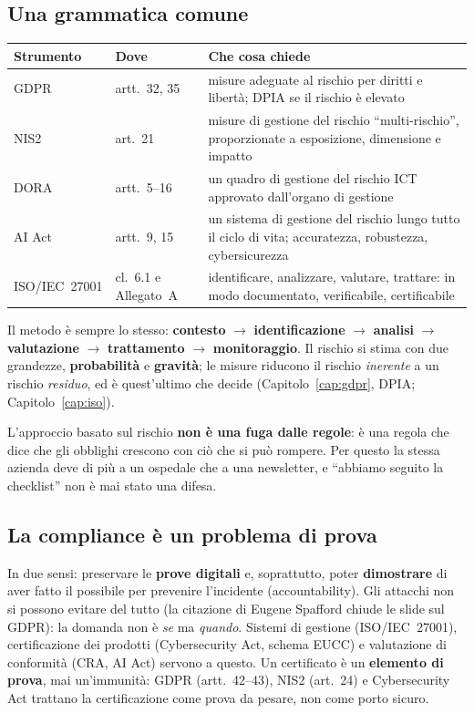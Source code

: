 \subsection{Una grammatica comune}
\begin{center}
\small
\begin{tabularx}{\linewidth}{>{\raggedright\arraybackslash}p{2.4cm} >{\raggedright\arraybackslash}p{2.6cm} X}
\toprule
\textbf{Strumento} & \textbf{Dove} & \textbf{Che cosa chiede}\\
\midrule
GDPR & artt.~32, 35 & misure adeguate al rischio per diritti e libertà; DPIA se il rischio è elevato\\
NIS2 & art.~21 & misure di gestione del rischio ``multi-rischio'', proporzionate a esposizione,
  dimensione e impatto\\
DORA & artt.~5--16 & un quadro di gestione del rischio ICT approvato dall'organo di gestione\\
AI Act & artt.~9, 15 & un sistema di gestione del rischio lungo tutto il ciclo di vita; accuratezza,
  robustezza, cybersicurezza\\
ISO/IEC~27001 & cl.~6.1 e Allegato~A & identificare, analizzare, valutare, trattare: in modo
  documentato, verificabile, certificabile\\
\bottomrule
\end{tabularx}
\end{center}
Il metodo è sempre lo stesso: \textbf{contesto} $\rightarrow$ \textbf{identificazione} $\rightarrow$
\textbf{analisi} $\rightarrow$ \textbf{valutazione} $\rightarrow$ \textbf{trattamento} $\rightarrow$
\textbf{monitoraggio}. Il rischio si stima con due grandezze, \textbf{probabilità} e \textbf{gravità};
le misure riducono il rischio \emph{inerente} a un rischio \emph{residuo}, ed è quest'ultimo che decide
(Capitolo~\ref{cap:gdpr}, DPIA; Capitolo~\ref{cap:iso}).

L'approccio basato sul rischio \textbf{non è una fuga dalle regole}: è una regola che dice che gli
obblighi crescono con ciò che si può rompere. Per questo la stessa azienda deve di più a un ospedale che a
una newsletter, e ``abbiamo seguito la checklist'' non è mai stato una difesa.

\subsection{La compliance è un problema di prova}
In due sensi: preservare le \textbf{prove digitali} e, soprattutto, poter \textbf{dimostrare} di aver
fatto il possibile per prevenire l'incidente (accountability). Gli attacchi non si possono evitare del
tutto (la citazione di Eugene Spafford chiude le slide sul GDPR): la domanda non è \emph{se} ma
\emph{quando}. Sistemi di gestione (ISO/IEC~27001), certificazione dei prodotti (Cybersecurity Act,
schema EUCC) e valutazione di conformità (CRA, AI Act) servono a questo. Un certificato è un
\textbf{elemento di prova}, mai un'immunità: GDPR (artt.~42--43), NIS2 (art.~24) e Cybersecurity Act
trattano la certificazione come prova da pesare, non come porto sicuro.

